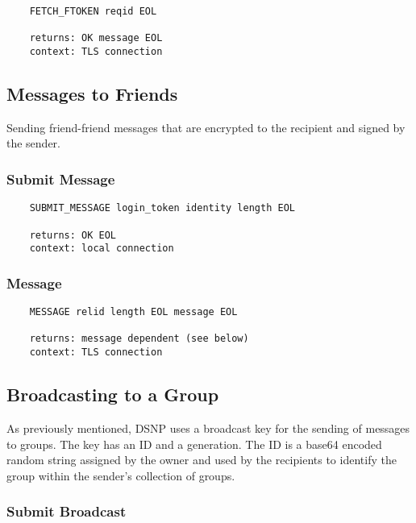 \documentclass[letterpaper,11pt,oneside]{article}
\begin{document}
\vspace{10pt}
\begin{verbatim}
    FETCH_FTOKEN reqid EOL

    returns: OK message EOL
    context: TLS connection
\end{verbatim}

\subsection{Messages to Friends}

Sending friend-friend messages that are encrypted to the recipient and signed
by the sender. 

\subsubsection{Submit Message}

\vspace{10pt}
\begin{verbatim}
    SUBMIT_MESSAGE login_token identity length EOL

    returns: OK EOL
    context: local connection
\end{verbatim}
\vspace{10pt}

\subsubsection{Message}

\vspace{10pt}
\begin{verbatim}
    MESSAGE relid length EOL message EOL

    returns: message dependent (see below)
    context: TLS connection
\end{verbatim}

\subsection{Broadcasting to a Group}

As previously mentioned, DSNP uses a broadcast key for the sending of messages
to groups. The key has an ID and a generation. The ID is a base64 encoded
random string assigned by the owner and used by the recipients to identify the
group within the sender's collection of groups.

\subsubsection{Submit Broadcast}
\end{document}
